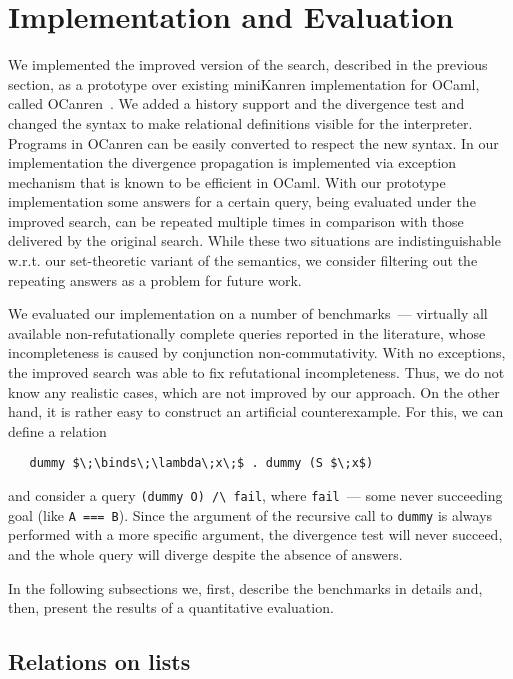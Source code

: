 \section{Implementation and Evaluation}
\label{evaluation}

We implemented the improved version of the search, described in the previous section, 
as a prototype over existing miniKanren implementation for OCaml, called OCanren~\cite{OCanren}. 
We added a history support and the divergence test and changed the syntax to make relational definitions
visible for the interpreter. Programs in OCanren can be easily converted to respect the new syntax.
In our implementation the divergence propagation is implemented via exception mechanism that is
known to be efficient in OCaml. With our prototype implementation some answers for a certain query, being
evaluated under the improved search, can be repeated multiple times in comparison with those delivered by the
original search. While these two situations are indistinguishable w.r.t. our set-theoretic variant of the semantics,
we consider filtering out the repeating answers as a problem for future work.

We evaluated our implementation on a number of benchmarks~--- virtually all available non-refutationally
complete queries reported in the literature, whose incompleteness is caused by conjunction non-commutativity.
With no exceptions, the improved search was able to fix refutational incompleteness. Thus, we do not know any
realistic cases, which are not improved by our approach. On the other hand, it is rather easy to construct
an artificial counterexample. For this, we can define a relation

\begin{lstlisting}
   dummy $\;\binds\;\lambda\;x\;$ . dummy (S $\;x$)
\end{lstlisting}

\noindent and consider a query \lstinline|(dummy O) /\ fail|, where \lstinline|fail|~--- some never
succeeding goal (like \lstinline|A === B|). Since the argument of the recursive call to \lstinline|dummy| is
always performed with a more specific argument, the divergence test will never succeed, and the whole
query will diverge despite the absence of answers. 

In the following subsections we, first, describe the benchmarks in details and, then, present the
results of a quantitative evaluation.

\subsection{Relations on lists}

